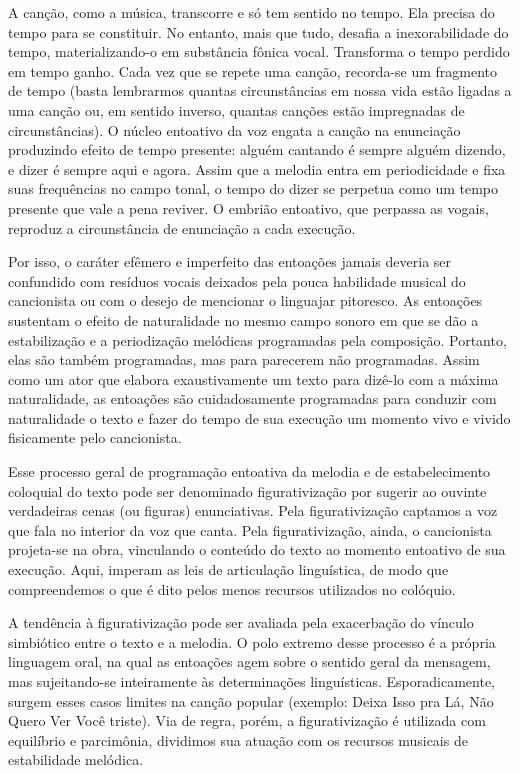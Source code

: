 A canção, como a música, transcorre e só tem sentido no tempo. Ela
precisa do tempo para se constituir. No entanto, mais que tudo, desafia
a inexorabilidade do tempo, materializando-o em substância fônica vocal.
Transforma o tempo perdido em tempo ganho. Cada vez que se repete uma
canção, recorda-se um fragmento de tempo (basta lembrarmos quantas
circunstâncias em nossa vida estão ligadas a uma canção ou, em sentido
inverso, quantas canções estão impregnadas de circunstâncias). O núcleo
entoativo da voz engata a canção na enunciação produzindo efeito de
tempo presente: alguém cantando é sempre alguém dizendo, e dizer é
sempre aqui e agora. Assim que a melodia entra em periodicidade e fixa
suas frequências no campo tonal, o tempo do dizer se perpetua como um
tempo presente que vale a pena reviver. O embrião entoativo, que
perpassa as vogais, reproduz a circunstância de enunciação a cada
execução.~

Por isso, o caráter efêmero e imperfeito das entoações jamais deveria
ser confundido com resíduos vocais deixados pela pouca habilidade
musical do cancionista ou com o desejo de mencionar o linguajar
pitoresco. As entoações sustentam o efeito de naturalidade no mesmo
campo sonoro em que se dão a estabilização e a periodização melódicas
programadas pela composição. Portanto, elas são também programadas, mas
para parecerem não programadas. Assim como um ator que elabora
exaustivamente um texto para dizê-lo com a máxima naturalidade, as
entoações são cuidadosamente programadas para conduzir com naturalidade
o texto e fazer do tempo de sua execução um momento vivo e vivido
fisicamente pelo cancionista.~

Esse processo geral de programação entoativa da melodia e de
estabelecimento coloquial do texto pode ser denominado figurativização
por sugerir ao ouvinte verdadeiras cenas (ou figuras) enunciativas. Pela
figurativização captamos a voz que fala no interior da voz que canta.
Pela figurativização, ainda, o cancionista projeta-se na obra,
vinculando o conteúdo do texto ao momento entoativo de sua execução.
Aqui, imperam as leis de articulação linguística, de modo que
compreendemos o que é dito pelos menos recursos utilizados no colóquio.~

A tendência à figurativização pode ser avaliada pela exacerbação do
vínculo simbiótico entre o texto e a melodia. O polo extremo desse
processo é a própria linguagem oral, na qual as entoações agem sobre o
sentido geral da mensagem, mas sujeitando-se inteiramente às
determinações linguísticas. Esporadicamente, surgem esses casos limites
na canção popular (exemplo: Deixa Isso pra Lá, Não Quero Ver Você
triste). Via de regra, porém, a figurativização é utilizada com
equilíbrio e parcimônia, dividimos sua atuação com os recursos musicais
de estabilidade melódica.~


